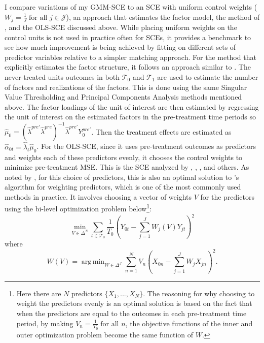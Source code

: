 \documentclass{article}
\DeclareMathOperator*{\argmin}{arg\,min}
\begin{document}
I compare variations of my GMM-SCE to an SCE with uniform control weights ($W_j = \frac{1}{J} \; \text{for all } j \in \mathcal{J}$), an approach that estimates the factor model, the method of \cite{Powell2021}, and the OLS-SCE discussed above. While placing uniform weights on the control units is not used in practice often for SCEs, it provides a benchmark to see how much improvement is being achieved by fitting on different sets of predictor variables relative to a simpler matching approach. For the method that explicitly estimates the factor structure, it follows an approach similar to \cite{IFE_with_SC}. The never-treated units outcomes in both $\mathcal{T}_0$ and $\mathcal{T}_1$ are used to estimate the number of factors and realizations of the factors. This is done using the same Singular Value Thresholding and Principal Components Analysis methods mentioned above. The factor loadings of the unit of interest are then estimated by regressing the unit of interest on the estimated factors in the pre-treatment time periods so $\hat{\mu}_0 = (\hat{\lambda}^{pre'}\hat{\lambda}^{pre})^{-1}\hat{\lambda}^{pre'}Y_0^{pre'}$. Then the treatment effects are estimated as $\hat{\alpha}_{0t} = \hat{\lambda}_t \hat{\mu}_0$. For the OLS-SCE, since it uses pre-treatment outcomes as predictors and weights each of these predictors evenly, it chooses the control weights to minimize pre-treatment MSE. This is the SCE analyzed by \cite{LargeSampleProperties}, \cite{ImperfectFit}, \cite{Li2020}, and others. As noted by \cite{IncludingAllLags}, for this choice of predictors, this is also an optimal solution to \cite{Abadie2010}'s algorithm for weighting predictors, which is one of the most commonly used methods in practice. It involves choosing a vector of weights $V$ for the predictors using the bi-level optimization problem below\footnote{Here there are $N$ predictors $\{X_1,...,X_N\}$. The reasoning for why choosing to weight the predictors evenly is an optimal solution is based on the fact that when the predictors are equal to the outcomes in each pre-treatment time period, by making $V_n = \frac{1}{T_0} \; \text{for all } n$, the objective functions of the inner and outer optimization problem become the same function of $W$.}:
\begin{equation}  \label{eq: AndG 2003 SC}
	\min_{V \in \Delta^N} \sum_{t \in \mathcal{T}_0} \frac{1}{T_0} (Y_{0t} - \sum_{j=1}^J W_j(V) Y_{jt})^2 
\end{equation}
where
\begin{equation*}
	W(V) = \argmin_{W \in \Delta^J} \sum_{n=1}^N V_n (X_{0n} - \sum_{j=1}^J W_{j} X_{jn})^2.
\end{equation*}
\end{document}

